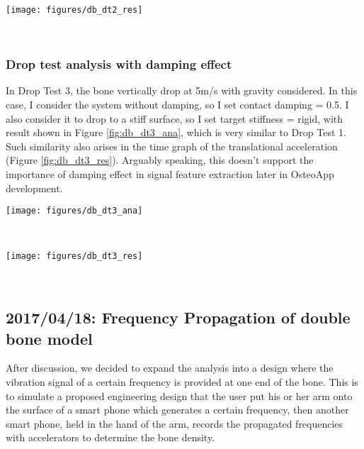 \documentclass{sigchi}
\begin{document}
\begin{figure*}
  \centering
  \texttt{[image: figures/db\_dt2\_res]}
  \caption{response graphs for Drop Test 2 for double bone in three different location (nodes).}
    ~\label{fig:db_dt2_res}
\end{figure*}


\subsubsection{Drop test analysis with damping effect}

In Drop Test 3, the bone vertically drop at 5m/s with gravity considered. In this case, I consider the system without damping, so I set contact damping = 0.5. I also consider it to drop to a stiff surface, so I set target stiffness = rigid, with result shown in Figure \ref{fig:db_dt3_ana}, which is very similar to Drop Test 1. Such similarity also arises in the time graph of the translational acceleration (Figure \ref{fig:db_dt3_res}). Arguably speaking, this doesn't support the importance of damping effect in signal feature extraction later in OsteoApp development. 

\begin{figure*}
  \centering
  \texttt{[image: figures/db\_dt3\_ana]}
  \caption{analysis for Drop Test 3 for double bone in (a) stress, (b) displacement and (c) strain.}
    ~\label{fig:db_dt3_ana}
\end{figure*}

\begin{figure*}
  \centering
  \texttt{[image: figures/db\_dt3\_res]}
  \caption{response graphs for Drop Test 3 for double bone in three different location (nodes).}
    ~\label{fig:db_dt3_res}
\end{figure*}

\subsection{2017/04/18: Frequency Propagation of double bone model}

After discussion, we decided to expand the analysis into a design where the vibration signal of a certain frequency is provided at one end of the bone. This is to simulate a proposed engineering design that the user put his or her arm onto the surface of a smart phone which generates a certain frequency, then another smart phone, held in the hand of the arm, records the propagated frequencies with accelerators to determine the bone density.
\end{document}
